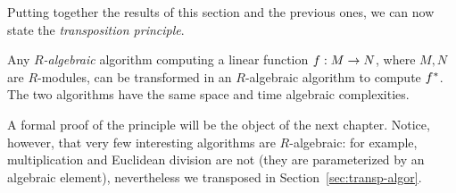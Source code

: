 Putting together the results of this section and the previous ones, we
can now state the \emph{transposition
  principle}.

\begin{theorem}
  \label{th:transp-princip}
   Any \emph{$R$-algebraic} algorithm
  computing a linear function $f:M\rightarrow N$, where $M,N$ are $R$-modules,
  can be transformed in an $R$-algebraic algorithm to compute
  $f^\ast$. The two algorithms have the same space and time
  algebraic complexities.
\end{theorem}


A formal proof of the principle will be the object of the next
chapter. Notice, however, that very few interesting algorithms are
$R$-algebraic: for example, multiplication and Euclidean division are
not (they are parameterized by an algebraic element), nevertheless we
transposed in Section~\ref{sec:transp-algor}.



